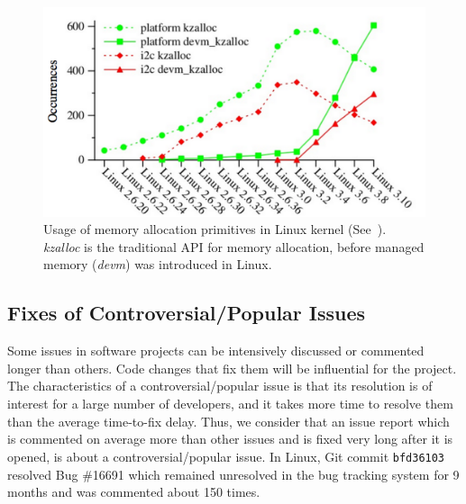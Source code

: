 \begin{figure}[!h]%
    \centering
    \includegraphics[width=0.6\linewidth]{fig/devm}
    \caption{Usage of memory allocation primitives in Linux kernel (See~\cite{recipes_devm}). {\em kzalloc} is the traditional API for memory allocation,
before managed memory ({\em devm}) was introduced in Linux.}
    \label{fig:devm}
\end{figure}


\subsection{Fixes of Controversial/Popular Issues}
Some issues in software projects can be intensively discussed or commented longer than others.
Code changes that fix them will be influential for the project. The characteristics of a controversial/popular issue
 is that its resolution is of interest for a large number of developers, and it takes more time
to resolve them than the average time-to-fix delay. Thus, we consider that an issue report
which is commented on average more than other issues and is fixed very long after it
is opened, is about a controversial/popular issue. In Linux, Git commit {\tt bfd36103}
resolved Bug \#16691 which remained unresolved in the bug tracking system for 9 months
and was commented about 150 times.
